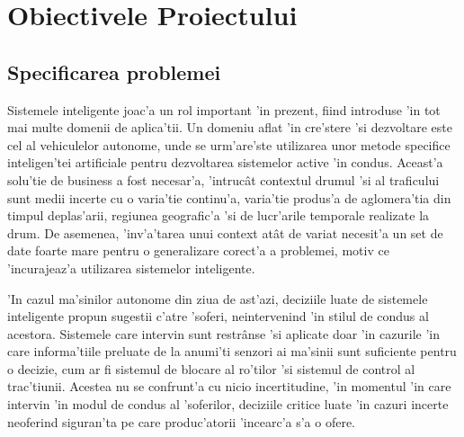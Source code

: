 \documentclass[12pt,a4paper,twoside]{report}
\begin{document}
\chapter{Obiectivele Proiectului}
\section{Specificarea problemei}
Sistemele inteligente joac'a un rol important 'in prezent, fiind introduse 'in tot mai multe domenii de aplica'tii. Un domeniu aflat 'in cre'stere 'si dezvoltare este cel al vehiculelor autonome, unde se urm'are'ste utilizarea unor metode specifice inteligen'tei artificiale pentru dezvoltarea sistemelor active 'in condus. Aceast'a solu'tie de business a fost necesar'a,  'intruc\^at  contextul drumul 'si al traficului sunt medii incerte cu o varia'tie continu'a, varia'tie produs'a de aglomera'tia din timpul deplas'arii, regiunea geografic'a 'si de lucr'arile temporale realizate la drum. De asemenea, 'inv'a'tarea unui context at\^at de variat necesit'a un set de date foarte mare pentru o generalizare corect'a a problemei,  motiv ce 'incurajeaz'a utilizarea sistemelor inteligente.

'In cazul ma'sinilor autonome din ziua de ast'azi, deciziile luate de sistemele inteligente propun sugestii c'atre 'soferi, neintervenind 'in stilul de condus al acestora. Sistemele care intervin sunt restr\^anse 'si aplicate doar 'in cazurile 'in care informa'tiile preluate de la anumi'ti senzori ai ma'sinii  sunt suficiente pentru o decizie, cum ar fi sistemul de blocare al ro'tilor 'si sistemul de control al trac'tiunii. Acestea nu se confrunt'a cu nicio incertitudine, 'in momentul 'in care intervin 'in modul de condus al 'soferilor, deciziile critice luate 'in cazuri incerte neoferind siguran'ta pe care produc'atorii 'incearc'a s'a o ofere.  
\end{document}
